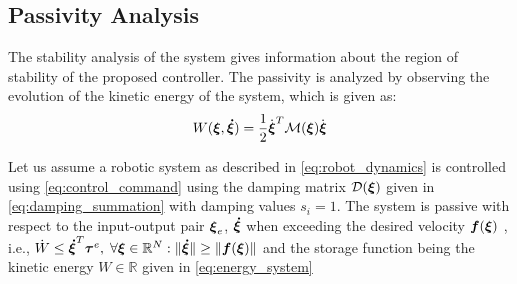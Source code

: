 \subsection{Passivity Analysis}
The stability analysis of the system gives information about the region of stability of the proposed controller. The passivity is analyzed by observing the evolution of the kinetic energy of the system, which is given as:
\begin{equation}
	W(\vecs \xi, \vecs{\dot \xi}) = \frac{1}{2}  \dot{\vecs{\xi}}^T \matd{M}(\vecs \xi) \dot{\vecs{\xi}} \label{eq:energy_system}
\end{equation}

\begin{lemma} \label{lemma:passivity}
   Let us assume a robotic system as described in \eqref{eq:robot_dynamics} is controlled using \eqref{eq:control_command} using the damping matrix $\mathcal{D}(\boldsymbol{\xi})$ given in \eqref{eq:damping_summation} with damping values $s_i = 1$.
   The system is passive with respect to the input-output pair $\boldsymbol{\xi}_e$, $\boldsymbol{\dot \xi}$ when exceeding the desired velocity $\boldsymbol{f}(\boldsymbol{\xi})$ , i.e., $\dot{W} \leq \boldsymbol{\dot \xi}^T \boldsymbol{\tau}^e, \; \forall \boldsymbol{\xi} \in \mathbb{R}^N: \| \boldsymbol{\dot \xi} \| \geq \| \boldsymbol{f}(\boldsymbol{\xi}) \|$ and the storage function being the kinetic energy $W \in \mathbb{R}$ given in \eqref{eq:energy_system}
\end{lemma}

